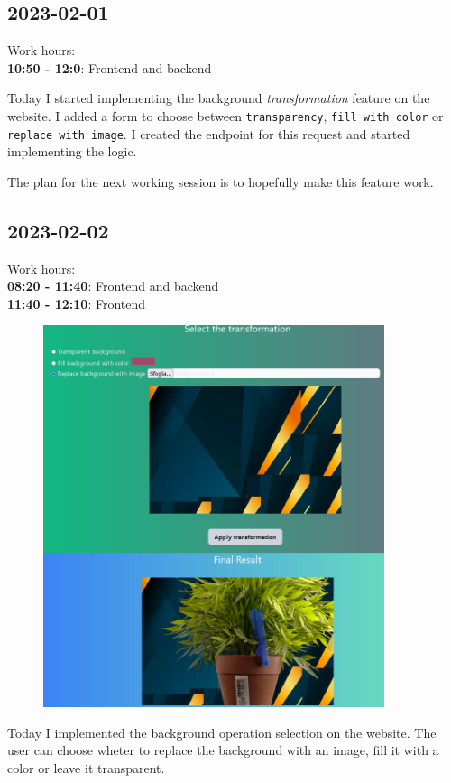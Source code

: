 \documentclass{article}
\begin{document}
\subsection{2023-02-01}

Work hours:\\
\textbf{10:50 - 12:0}: Frontend and backend

Today I started implementing the background \textit{transformation}
feature on the website. I added a form to choose between
\texttt{transparency}, \texttt{fill with color} or
\texttt{replace with image}.
I created the endpoint for this request and started implementing the logic.

The plan for the next working session is to hopefully make this feature
work.

\subsection{2023-02-02}

Work hours:\\
\textbf{08:20 - 11:40}: Frontend and backend \\
\textbf{11:40 - 12:10}: Frontend

\begin{figure}
    \vspace{-\intextsep}
    \includegraphics[width=10cm]{web2.png}
\end{figure}

Today I implemented the background operation selection on the website.
The user can choose wheter to replace the background with an image,
fill it with a color or leave it transparent.
\end{document}
